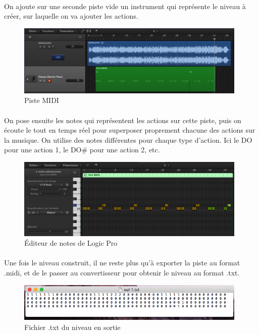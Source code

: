 \paragraph{}
On ajoute sur une seconde piste vide un instrument qui représente le niveau à créer, sur laquelle on va ajouter les actions.\\

\begin{figure}[H]\centering
  \includegraphics[width=11cm]{./img/logic_midi.png}
  \caption{Piste MIDI}
\end{figure}


\paragraph{}
On pose ensuite les notes qui représentent les actions sur cette piste, puis on écoute le tout en temps réel pour superposer proprement chacune des actions sur la musique. On utilise des notes différentes pour chaque type d'action. Ici le DO pour une action 1, le DO\# pour une action 2, etc.

\begin{figure}[H]\centering
  \includegraphics[width=11cm]{./img/logic_edit.png}
  \caption{Éditeur de notes de Logic Pro}
  \label{pianoroll}
\end{figure}

\paragraph{}
Une fois le niveau construit, il ne reste plus qu'à exporter la piste au format .midi, et de le passer au convertisseur pour obtenir le niveau au format .txt.

\begin{figure}[H]\centering
  \includegraphics[width=11cm]{./img/logic_export.png}
  \caption{Fichier .txt du niveau en sortie}
  \label{level}
\end{figure}

